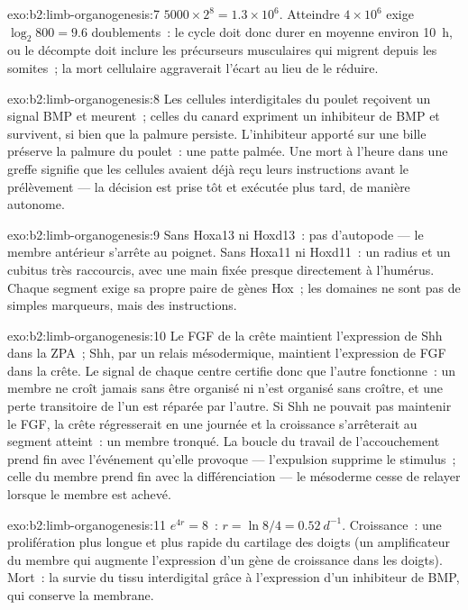 \begin{solution}{exo:b2:limb-organogenesis:7}
$5000\times 2^{8} = 1.3\times 10^{6}$. Atteindre $4\times 10^{6}$ exige
$\log_2 800 = 9.6$ doublements~: le cycle doit donc durer en moyenne
environ \qty{10}{h}, ou le décompte doit inclure les précurseurs
musculaires qui migrent depuis les somites~; la mort cellulaire
aggraverait l'écart au lieu de le réduire.
\end{solution}

\begin{solution}{exo:b2:limb-organogenesis:8}
Les cellules interdigitales du poulet reçoivent un signal BMP et
meurent~; celles du canard expriment un inhibiteur de BMP et survivent,
si bien que la palmure persiste. L'inhibiteur apporté sur une bille
préserve la palmure du poulet~: une patte palmée. Une mort à l'heure
dans une greffe signifie que les cellules avaient déjà reçu leurs
instructions avant le prélèvement --- la décision est prise tôt et
exécutée plus tard, de manière autonome.
\end{solution}

\begin{solution}{exo:b2:limb-organogenesis:9}
Sans Hoxa13 ni Hoxd13~: pas d'autopode --- le membre antérieur s'arrête
au poignet. Sans Hoxa11 ni Hoxd11~: un radius et un cubitus très
raccourcis, avec une main fixée presque directement à l'humérus. Chaque
segment exige sa propre paire de gènes Hox~; les domaines ne sont pas de
simples marqueurs, mais des instructions.
\end{solution}

\begin{solution}{exo:b2:limb-organogenesis:10}
Le FGF de la crête maintient l'expression de Shh dans la ZPA~; Shh, par
un relais mésodermique, maintient l'expression de FGF dans la crête. Le
signal de chaque centre certifie donc que l'autre fonctionne~: un membre
ne croît jamais sans être organisé ni n'est organisé sans croître, et
une perte transitoire de l'un est réparée par l'autre. Si Shh ne pouvait
pas maintenir le FGF, la crête régresserait en une journée et la
croissance s'arrêterait au segment atteint~: un membre tronqué. La
boucle du travail de l'accouchement prend fin avec l'événement qu'elle
provoque --- l'expulsion supprime le stimulus~; celle du membre prend
fin avec la différenciation --- le mésoderme cesse de relayer lorsque le
membre est achevé.
\end{solution}

\begin{solution}{exo:b2:limb-organogenesis:11}
$e^{4r} = 8$~: $r = \ln 8/4 = \qty{0.52}{d^{-1}}$. Croissance~: une
prolifération plus longue et plus rapide du cartilage des doigts (un
amplificateur du membre qui augmente l'expression d'un gène de
croissance dans les doigts). Mort~: la survie du tissu interdigital
grâce à l'expression d'un inhibiteur de BMP, qui conserve la membrane.
\end{solution}

